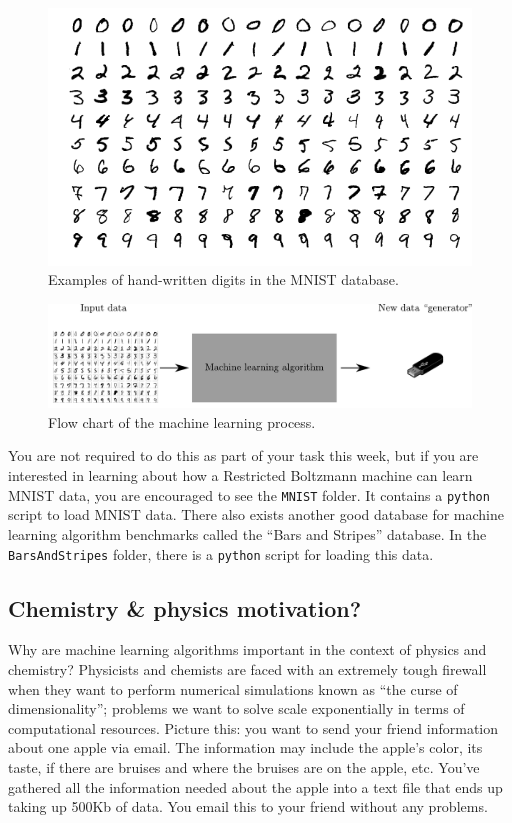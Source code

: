 \documentclass[12pt]{article}
\begin{document}
\begin{figure}
    \begin{center}
        \includegraphics[width=0.5\linewidth]{../figures/MnistExamples.png}
    \end{center}
    \caption{Examples of hand-written digits in the MNIST database.}
    \label{fig:MNIST_digits}
\end{figure}

\begin{figure}
    \begin{center}
        \includegraphics[width=\linewidth]{../figures/MNIST_ML.pdf}
    \end{center}
    \caption{Flow chart of the machine learning process.}
    \label{fig:MNIST_ML}
\end{figure}

You are not required to do this as part of your task this week, but if you are interested in learning about how a Restricted Boltzmann machine can learn MNIST data, you are encouraged to see the \texttt{MNIST} folder. It contains a \texttt{python} script to load MNIST data. There also exists another good database for machine learning algorithm benchmarks called the ``Bars and Stripes'' database. In the \texttt{BarsAndStripes} folder, there is a \texttt{python} script for loading this data.  

\subsection*{Chemistry \& physics motivation?}

Why are machine learning algorithms important in the context of physics and chemistry? Physicists and chemists are faced with an extremely tough firewall when they want to perform numerical simulations known as ``the curse of dimensionality''; problems we want to solve scale exponentially in terms of computational resources. Picture this: you want to send your friend information about one apple via email. The information may include the apple's color, its taste, if there are bruises and where the bruises are on the apple, etc. You've gathered all the information needed about the apple into a text file that ends up taking up 500Kb of data. You email this to your friend without any problems. 
\end{document}
